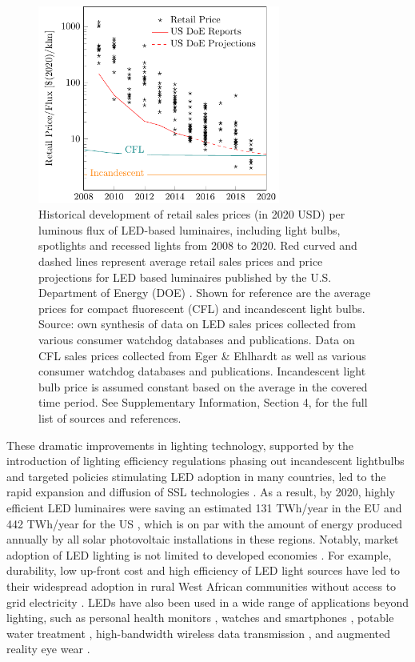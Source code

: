 \documentclass[journal=jacsat,manuscript=article]{achemso}
\begin{document}
\begin{figure}[h!]
\centering
  \includegraphics[height=6.5cm]{figures/cost_lamp_small.pdf}
  \caption{Historical development of retail sales prices (in 2020 USD) per luminous flux of LED-based luminaires, including light bulbs, spotlights and recessed lights from 2008 to 2020. Red curved and dashed lines represent average retail sales prices and price projections for LED based luminaires published by the U.S. Department of Energy (DOE) \cite{council2013assessment}. Shown for reference are the average prices for compact fluorescent (CFL) and incandescent light bulbs. Source: own synthesis of data on LED sales prices collected from various consumer watchdog databases and publications. Data on CFL sales prices collected from Eger \& Ehlhardt \cite{eger2018origin} as well as various consumer watchdog databases and publications. Incandescent light bulb price is assumed constant based on the average in the covered time period. See Supplementary Information, Section 4, for the full list of sources and references.}
  \label{fgr:cost_lamp_small}
\end{figure}

These dramatic improvements in lighting technology, supported by the introduction of lighting efficiency regulations phasing out incandescent lightbulbs and targeted policies stimulating LED adoption in many countries, led to the rapid expansion and diffusion of SSL technologies  \cite{weinold2020long,Mills2014,Stegmaier2021,grubb2021new}. As a result, by 2020, highly efficient LED luminaires were saving an estimated 131 TWh/year in the EU \cite{eu2019impactass} and 442 TWh/year for the US \cite{guidehouse2020adoption}, which is on par with the amount of energy produced annually by all solar photovoltaic installations in these regions. Notably, market adoption of LED lighting is not limited to developed economies \cite{Kamat2020}. For example, durability, low up-front cost and high efficiency of LED light sources have led to their widespread adoption in rural West African communities without access to grid electricity \cite{Bensch2017}. LEDs have also been used in a wide range of applications beyond lighting, such as personal health monitors \cite{o2019optical,Wyatt2020}, watches and smartphones \cite{Bai2017}, potable water treatment \cite{Lui2014}, high-bandwidth wireless data transmission \cite{Haas2016}, and augmented reality eye wear \cite{Lee2016}. 
\end{document}
